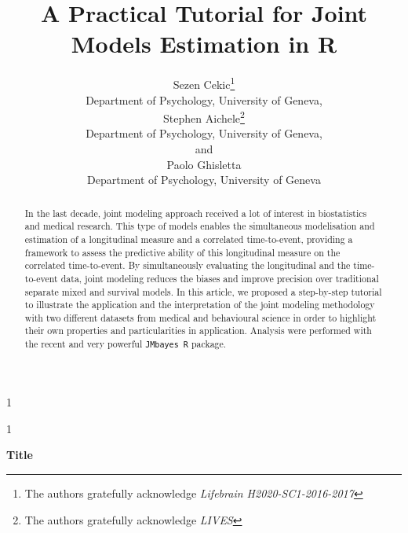 \documentclass[12pt]{article}
\newcommand{\blind}{1}
\begin{document}
%


\renewcommand{\baselinestretch}{1.2}



\blind
{
  \title{\bf A Practical Tutorial for Joint Models Estimation in R}
  \author{
    Sezen Cekic\thanks{
    The authors gratefully acknowledge \textit{Lifebrain H2020-SC1-2016-2017}}\hspace{.2cm}\\
    Department of Psychology, University of Geneva,   \\
    Stephen Aichele\thanks{
    The authors gratefully acknowledge \textit{LIVES}}\hspace{.2cm}\\
    Department of Psychology, University of Geneva,\\
    and \\
    Paolo Ghisletta \\
    Department of Psychology, University of Geneva}
  \maketitle
} \fi

\blind
{
  \bigskip
  \bigskip
  \bigskip
  \begin{center}
    {\LARGE\bf Title}
\end{center}
  \medskip
} \fi

\bigskip
\begin{abstract}
In the last decade, joint modeling approach received a lot of interest in biostatistics and medical research.
This type of models enables the simultaneous modelisation and estimation of a longitudinal measure and a correlated time-to-event, providing a framework to assess the predictive ability of this longitudinal measure on the correlated time-to-event. By simultaneously evaluating the longitudinal and the time-to-event data, joint modeling reduces the biases and improve precision over traditional separate mixed and survival models. In this article, we proposed a step-by-step tutorial to illustrate the application and the interpretation of the joint modeling methodology with two different datasets from medical and behavioural science in order to highlight their own properties and particularities in application. Analysis were performed with the recent and very powerful \texttt{JMbayes R} package.

\end{abstract}
\end{document}
